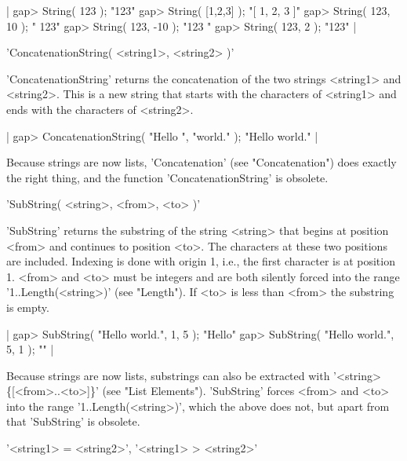 |    gap> String( 123 );
    "123"
    gap> String( [1,2,3] );
    "[ 1, 2, 3 ]"
    gap> String( 123, 10 );
    "       123"
    gap> String( 123, -10 );
    "123       "
    gap> String( 123, 2 );
    "123" |

%

'ConcatenationString( <string1>, <string2> )'

'ConcatenationString'   returns   the  concatenation of the   two strings
<string1> and  <string2>.   This is a  new string  that  starts  with the
characters of <string1> and ends with the characters of <string2>.

|    gap> ConcatenationString( "Hello ", "world.\n" );
    "Hello world.\n" |

Because strings are now lists, 'Concatenation' (see "Concatenation") does
exactly the  right  thing,  and  the  function  'ConcatenationString'  is
obsolete.

%

'SubString( <string>, <from>, <to> )'

'SubString'  returns the  substring of  the string  <string> that begins at
position <from> and continues to position <to>. The characters at these two
positions  are included.  Indexing is  done with  origin 1, i.e., the first
character  is at position 1. <from> and  <to> must be integers and are both
silently  forced into  the range  '1..Length(<string>)' (see  "Length"). If
<to> is less than <from> the substring is empty.

|    gap> SubString( "Hello world.\n", 1, 5 );
    "Hello"
    gap> SubString( "Hello world.\n", 5, 1 );
    "" |

Because strings are  now  lists, substrings  can  also be extracted  with
'<string>\{[<from>..<to>]\}' (see "List  Elements").  'SubString'  forces
<from> and <to> into  the range  '1..Length(<string>)', which  the  above
does not, but apart from that 'SubString' is obsolete.

%

'<string1> = <string2>', '<string1> \<> <string2>'

